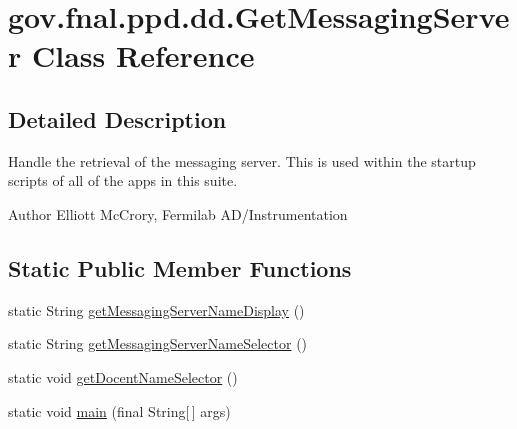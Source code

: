 \hypertarget{classgov_1_1fnal_1_1ppd_1_1dd_1_1GetMessagingServer}{\section{gov.\-fnal.\-ppd.\-dd.\-Get\-Messaging\-Server Class Reference}
\label{classgov_1_1fnal_1_1ppd_1_1dd_1_1GetMessagingServer}
}


\subsection{Detailed Description}
Handle the retrieval of the messaging server. This is used within the startup scripts of all of the apps in this suite.

\begin{DoxyAuthor}{Author}
Elliott Mc\-Crory, Fermilab A\-D/\-Instrumentation 
\end{DoxyAuthor}
\subsection*{Static Public Member Functions}
\begin{DoxyCompactItemize}
\item 
static String \hyperlink{classgov_1_1fnal_1_1ppd_1_1dd_1_1GetMessagingServer_a3b0e216307cae3742f3ff70aaf9ef8dc}{get\-Messaging\-Server\-Name\-Display} ()
\item 
static String \hyperlink{classgov_1_1fnal_1_1ppd_1_1dd_1_1GetMessagingServer_a61de9f8eb9c7e50565eb7d3d4f000cbb}{get\-Messaging\-Server\-Name\-Selector} ()
\item 
static void \hyperlink{classgov_1_1fnal_1_1ppd_1_1dd_1_1GetMessagingServer_afc14215a5c0b6624787c91e4d9501118}{get\-Docent\-Name\-Selector} ()
\item 
static void \hyperlink{classgov_1_1fnal_1_1ppd_1_1dd_1_1GetMessagingServer_a06768dfe96070006b7b3907a52def51e}{main} (final String\mbox{[}$\,$\mbox{]} args)
\end{DoxyCompactItemize}


